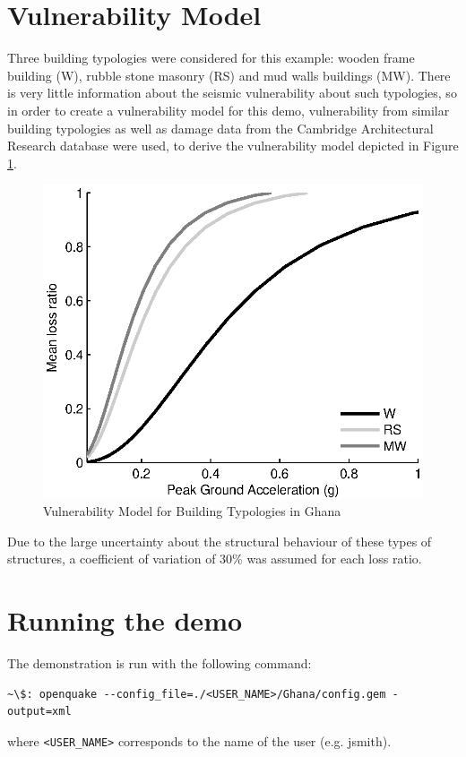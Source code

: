 \section{Vulnerability Model}
Three building typologies were considered for this example: wooden 
frame building (W), rubble stone masonry (RS) and mud walls buildings 
(MW). There is very little information about the seismic vulnerability 
about such typologies, so in order to create a vulnerability model for
this demo, vulnerability from similar building typologies as well as 
damage data from the Cambridge Architectural Research database were 
used, to derive the vulnerability model depicted in Figure 
\ref{fig:vulnerability}. 
%
\begin{figure}[htb]
	\centering
		\includegraphics{./figures/vulnerability.eps}
	\caption{Vulnerability Model for Building Typologies in Ghana}
	\label{fig:vulnerability}
\end{figure}
%
Due to the large uncertainty about the structural behaviour of these
types of structures, a coefficient of variation of 30\% was assumed 
for each loss ratio.

\clearpage
\section{Running the demo}
The demonstration is run with the following command:

\begin{Verbatim}[frame=single, commandchars=\\\{\}, fontsize=\scriptsize]
   ~\$: openquake --config_file=./<USER_NAME>/Ghana/config.gem -output=xml
\end{Verbatim}
where \texttt{<USER\_NAME>} corresponds to the name of the user (e.g. jsmith).

